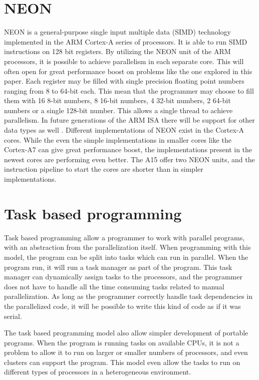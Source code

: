 \section{NEON}
NEON is a general-purpose single input multiple data (SIMD) technology implemented in the ARM Cortex-A series of processors.
It is able to run SIMD instructions on 128 bit registers.
By utilizing the NEON unit of the ARM processors, it is possible to achieve parallelism in each separate core.
This will often open for great performance boost on problems like the one explored in this paper.
Each register may be filled with single precision floating point numbers ranging from 8 to 64-bit each.
This mean that the programmer may choose to fill them with 16 8-bit numbers, 8 16-bit numbers, 4 32-bit numbers, 2 64-bit numbers or a single 128-bit number.
This allows a single thread to achieve parallelism.
In future generations of the ARM ISA there will be support for other data types as well \cite{neondata}.
Different implementations of NEON exist in the Cortex-A cores.
While the even the simple implementations in smaller cores like the Cortex-A7 can give great performance boost, the implementations present in the newest cores are performing even better.
The A15 offer two NEON units, and the instruction pipeline to start the cores are shorter than in simpler implementations.

\section{Task based programming}
Task based programming allow a programmer to work with parallel programs, with an abstraction from the parallelization itself.
When programming with this model, the program can be split into tasks which can run in parallel.
When the program run, it will run a task manager as part of the program.
This task manager can dynamically assign tasks to the processors, and the programmer does not have to handle all the time consuming tasks related to manual parallelization.
As long as the programmer correctly handle task dependencies in the parallelized code, it will be possible to write this kind of code as if it was serial.

The task based programming model also allow simpler development of portable programs.
When the program is running tasks on available CPUs, it is not a problem to allow it to run on larger or smaller numbers of processors, and even clusters can support the program.
This model even allow the tasks to run on different types of processors in a heterogeneous environment.


